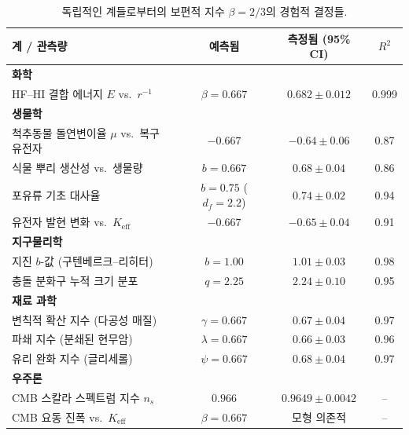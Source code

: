 \documentclass[11pt,a4paper]{article}
\begin{document}
\begin{table}[H]
	\centering
	\caption{독립적인 계들로부터의 보편적 지수 \(\beta = 2/3\)의 경험적 결정들.}
	\label{tab:empirical-beta}
	\small
	\begin{tabular}{lccc}
		\toprule
		\textbf{계 / 관측량} & \textbf{예측됨} & \textbf{측정됨 (95\% CI)} & \(R^2\) \\
		\midrule
		\textbf{화학} & & & \\
		\quad HF–HI 결합 에너지 \(E\) vs.\ \(r^{-1}\) & \(\beta = 0.667\) & \(0.682 \pm 0.012\) & 0.999 \\
		\textbf{생물학} & & & \\
		\quad 척추동물 돌연변이율 \(\mu\) vs.\ 복구 유전자 & \(-0.667\) & \(-0.64 \pm 0.06\) & 0.87 \\
		\quad 식물 뿌리 생산성 vs.\ 생물량 & \(b = 0.667\) & \(0.68 \pm 0.04\) & 0.86 \\
		\quad 포유류 기초 대사율 & \(b = 0.75\) (\(d_f=2.2\)) & \(0.74 \pm 0.02\) & 0.94 \\
		\quad 유전자 발현 변화 vs.\ \(K_{\mathrm{eff}}\) & \(-0.667\) & \(-0.65 \pm 0.04\) & 0.91 \\
		\textbf{지구물리학} & & & \\
		\quad 지진 \(b\)-값 (구텐베르크–리히터) & \(b = 1.00\) & \(1.01 \pm 0.03\) & 0.98 \\
		\quad 충돌 분화구 누적 크기 분포 & \(q = 2.25\) & \(2.24 \pm 0.10\) & 0.95 \\
		\textbf{재료 과학} & & & \\
		\quad 변칙적 확산 지수 (다공성 매질) & \(\gamma = 0.667\) & \(0.67 \pm 0.04\) & 0.97 \\
		\quad 파쇄 지수 (분쇄된 현무암) & \(\lambda = 0.667\) & \(0.66 \pm 0.03\) & 0.96 \\
		\quad 유리 완화 지수 (글리세롤) & \(\psi = 0.667\) & \(0.68 \pm 0.04\) & 0.97 \\
		\textbf{우주론} & & & \\
		\quad CMB 스칼라 스펙트럼 지수 \(n_s\) & \(0.966\) & \(0.9649 \pm 0.0042\) & -- \\
		\quad CMB 요동 진폭 vs.\ \(K_{\mathrm{eff}}\) & \(\beta = 0.667\) & 모형 의존적 & -- \\
		\bottomrule
	\end{tabular}
\end{table}
\end{document}
